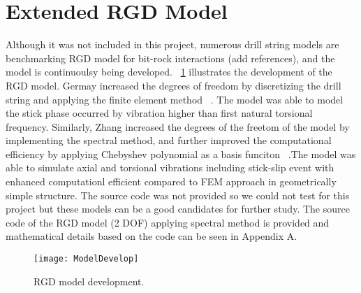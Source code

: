 \section{Extended RGD Model}
Although it was not included in this project, numerous drill string models are benchmarking RGD model for bit-rock interactions (add references), and the model is continuoulsy being developed. \figurename~\ref{model_develop_figure} illustrates the development of the RGD model. Germay increased the degrees of freedom by discretizing the drill string and applying the finite element method ~\cite{ref:germay2009a}. The model was able to model the stick phase occurred by vibration higher than first natural torsional frequency. Similarly, Zhang increased the degrees of the freetom of the model by implementing the spectral method, and further improved the computational efficiency by applying Chebyshev polynomial as a basis funciton ~\cite{ref:zhang2020a}.The model was able to simulate axial and torsional vibrations including stick-slip event with enhanced computationl efficient compared to FEM approach in geometrically simple structure. The source code was not provided so we could not test for this project but these models can be a good candidates for further study. The source code of the RGD model (2 DOF) applying spectral method is provided and mathematical details based on the code can be seen in Appendix A.

\begin{figure}[ht]
  \centering
  \texttt{[image: ModelDevelop]}
  \caption[RGD model development]{RGD model development.}\label{model_develop_figure}
\end{figure}



